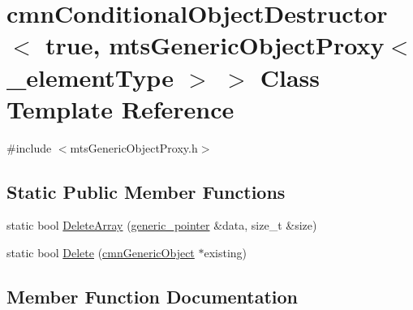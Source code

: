 \hypertarget{classcmn_conditional_object_destructor_3_01true_00_01mts_generic_object_proxy_3_01__element_type_01_4_01_4}{}\section{cmn\+Conditional\+Object\+Destructor$<$ true, mts\+Generic\+Object\+Proxy$<$ \+\_\+element\+Type $>$ $>$ Class Template Reference}
\label{classcmn_conditional_object_destructor_3_01true_00_01mts_generic_object_proxy_3_01__element_type_01_4_01_4}


{\ttfamily \#include $<$mts\+Generic\+Object\+Proxy.\+h$>$}

\subsection*{Static Public Member Functions}
\begin{DoxyCompactItemize}
\item 
static bool \hyperlink{classcmn_conditional_object_destructor_3_01true_00_01mts_generic_object_proxy_3_01__element_type_01_4_01_4_a7e70c1d2e93e36e8db8525ca77315bac}{Delete\+Array} (\hyperlink{classcmn_generic_object}{generic\+\_\+pointer} \&data, size\+\_\+t \&size)
\item 
static bool \hyperlink{classcmn_conditional_object_destructor_3_01true_00_01mts_generic_object_proxy_3_01__element_type_01_4_01_4_a94030471b4ad9ba9d4c803da8c3d029e}{Delete} (\hyperlink{classcmn_generic_object}{cmn\+Generic\+Object} $\ast$existing)
\end{DoxyCompactItemize}


\subsection{Member Function Documentation}
\hypertarget{classcmn_conditional_object_destructor_3_01true_00_01mts_generic_object_proxy_3_01__element_type_01_4_01_4_a94030471b4ad9ba9d4c803da8c3d029e}{}
